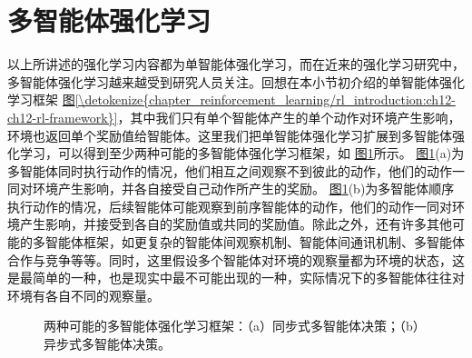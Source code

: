 \documentclass[letterpaper,10pt,english]{sphinxmanual}
\let\sphinxpxdimen\pdfpxdimen\else\newdimen\sphinxpxdimen
\begin{document}
\section{多智能体强化学习}
\label{\detokenize{chapter_reinforcement_learning/marl:id1}}\label{\detokenize{chapter_reinforcement_learning/marl::doc}}
\sphinxAtStartPar
以上所讲述的强化学习内容都为单智能体强化学习，而在近来的强化学习研究中，多智能体强化学习越来越受到研究人员关注。回想在本小节初介绍的单智能体强化学习框架
\hyperref[\detokenize{chapter_reinforcement_learning/rl_introduction:ch12-ch12-rl-framework}]{图\ref{\detokenize{chapter_reinforcement_learning/rl_introduction:ch12-ch12-rl-framework}}}，其中我们只有单个智能体产生的单个动作对环境产生影响，环境也返回单个奖励值给智能体。这里我们把单智能体强化学习扩展到多智能体强化学习，可以得到至少两种可能的多智能体强化学习框架，如
\hyperref[\detokenize{chapter_reinforcement_learning/marl:ch12-ch12-marl}]{图\ref{\detokenize{chapter_reinforcement_learning/marl:ch12-ch12-marl}}}所示。
\hyperref[\detokenize{chapter_reinforcement_learning/marl:ch12-ch12-marl}]{图\ref{\detokenize{chapter_reinforcement_learning/marl:ch12-ch12-marl}}}(a)为多智能体同时执行动作的情况，他们相互之间观察不到彼此的动作，他们的动作一同对环境产生影响，并各自接受自己动作所产生的奖励。
\hyperref[\detokenize{chapter_reinforcement_learning/marl:ch12-ch12-marl}]{图\ref{\detokenize{chapter_reinforcement_learning/marl:ch12-ch12-marl}}}(b)为多智能体顺序执行动作的情况，后续智能体可能观察到前序智能体的动作，他们的动作一同对环境产生影响，并接受到各自的奖励值或共同的奖励值。除此之外，还有许多其他可能的多智能体框架，如更复杂的智能体间观察机制、智能体间通讯机制、多智能体合作与竞争等等。同时，这里假设多个智能体对环境的观察量都为环境的状态，这是最简单的一种，也是现实中最不可能出现的一种，实际情况下的多智能体往往对环境有各自不同的观察量。

\begin{figure}[H]
\centering
\capstart

\noindent\sphinxincludegraphics[width=800\sphinxpxdimen]{{ch12-marl}.png}
\caption{两种可能的多智能体强化学习框架：（a）同步式多智能体决策；（b）异步式多智能体决策。}\label{\detokenize{chapter_reinforcement_learning/marl:id2}}\label{\detokenize{chapter_reinforcement_learning/marl:ch12-ch12-marl}}\end{figure}
\end{document}
